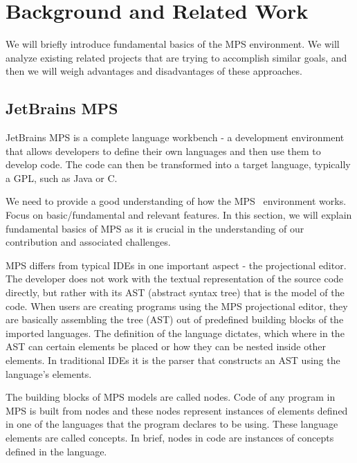\section{Background and Related Work}
\label{sect:BACKGRELWORK}


We will briefly introduce fundamental basics of the MPS environment.
We will analyze existing related projects that are trying to accomplish similar goals, and then we will weigh advantages and disadvantages of these approaches.

\subsection{JetBrains MPS}
\label{sect:MPS}

 JetBrains MPS is a complete language workbench - a development environment that allows developers to define their own languages and then use them to develop code. The code can then be transformed into a target language, typically a GPL, such as Java or C.

We need to provide a good understanding of how the MPS~\cite{ref:MPS} environment works.
Focus on basic/fundamental and relevant features. In this section, we will explain fundamental basics of MPS as it is crucial in the understanding of our contribution and associated challenges.

 MPS differs from typical IDEs in one important aspect - the projectional editor. The developer does not work with the textual representation of the source code directly, but rather with its AST (abstract syntax tree) that is the model of the code. When users are creating programs using the MPS projectional editor, they are basically assembling the tree (AST) out of predefined building blocks of the imported languages. The definition of the language dictates, which where in the AST can certain elements be placed or how they can be nested inside other elements. In traditional IDEs it is the parser that constructs an AST using the language's elements.

 The building blocks of MPS models are called nodes. Code of any program in MPS is built from nodes and these nodes represent instances of elements defined in one of the languages that the program declares to be using. These language elements are called concepts. In brief, nodes in code are instances of concepts defined in the language.

